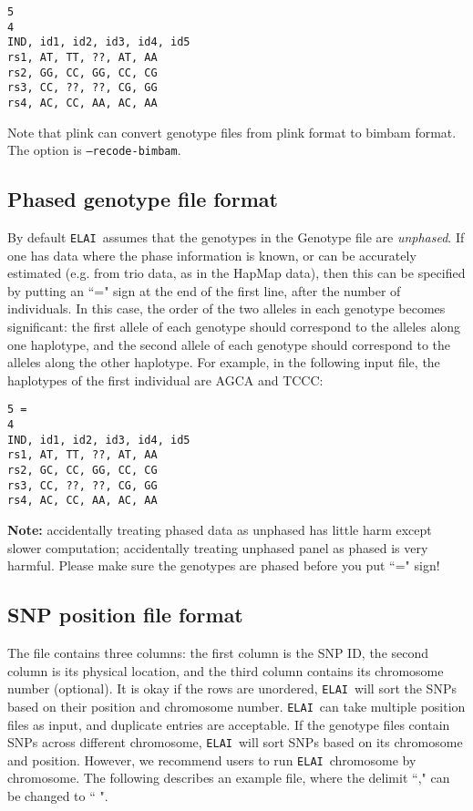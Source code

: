 \documentclass[11pt,Palatino]{article}
\def\elai{{\tt{ELAI}}~}
\begin{document}
\begin{verbatim}
5
4
IND, id1, id2, id3, id4, id5
rs1, AT, TT, ??, AT, AA
rs2, GG, CC, GG, CC, CG
rs3, CC, ??, ??, CG, GG
rs4, AC, CC, AA, AC, AA
\end{verbatim}
Note that plink can convert genotype files from plink format to bimbam format. The option is {\tt --recode-bimbam}. 


\subsection{Phased genotype file format}
By default \elai assumes that the genotypes in the Genotype file are {\it unphased}. If one has data where the phase
information is known, or can be accurately estimated (e.g. from trio data, as in the HapMap data), then this can be specified
by putting an ``=" sign at the end of the first line, after the number of individuals. In this case, the order of the two alleles in
each genotype becomes significant: the first allele of each genotype should correspond to the alleles along one haplotype, and the second allele of
each genotype should correspond to the alleles along the other haplotype. For example, in the following input file, the
haplotypes of the first individual are AGCA and TCCC:
\begin{verbatim}
5 =
4
IND, id1, id2, id3, id4, id5
rs1, AT, TT, ??, AT, AA
rs2, GC, CC, GG, CC, CG
rs3, CC, ??, ??, CG, GG
rs4, AC, CC, AA, AC, AA
\end{verbatim}

{\bf Note:} accidentally treating phased data as unphased has little harm except slower computation;  accidentally treating unphased panel as phased is very harmful.  Please make sure the genotypes are phased before you put ``=" sign!

\subsection{SNP position file format}

The file contains three columns:  the first column is the SNP ID, the second column is its physical location, and the third column contains its chromosome number (optional). 
It is okay if the rows are unordered, \elai will sort the SNPs based on their position and chromosome number.  \elai can take multiple position files as input, and duplicate entries are acceptable.
If the genotype files contain SNPs across different chromosome, \elai will sort SNPs based on its chromosome and position. 
However, we recommend users to run \elai chromosome by chromosome. 
The following describes an example file, where the delimit ``," can be changed to `` ". 
\end{document}
